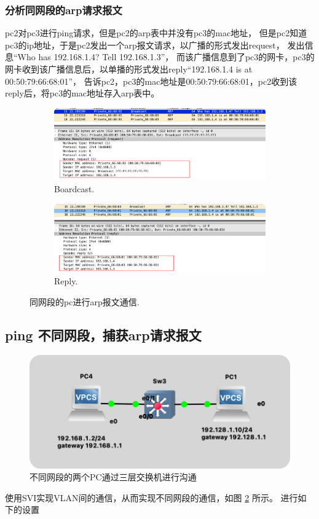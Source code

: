 \documentclass[a4paper,12pt]{report}
\begin{document}
\begin{spacing}{1.5}
\subsubsection*{分析同网段的arp请求报文}
pc2对pc3进行ping请求，但是pc2的arp表中并没有pc3的mac地址，
但是pc2知道pc3的ip地址，于是pc2发出一个arp报文请求，以广播的形式发出request，
发出信息“Who has 192.168.1.4? Tell 192.168.1.3”，
而该广播信息到了pc3的网卡，pc3的网卡收到该广播信息后，以单播的形式发出reply“192.168.1.4 is at 00:50:79:66:68:01”，
告诉pc2，pc3的mac地址是00:50:79:66:68:01，pc2收到该reply后，将pc3的mac地址存入arp表中。
\begin{figure}[h!]
  \centering
  \begin{subfigure}[b]{0.4\linewidth}
    \includegraphics[width=\linewidth]{figure/boardcast.png}
    \caption{Boardcast.}
  \end{subfigure}
  \begin{subfigure}[b]{0.4\linewidth}
    \includegraphics[width=\linewidth]{figure/reply.png}
    \caption{Reply.}
  \end{subfigure}
  \caption{同网段的pc进行arp报文通信.}
  \label{fig:sameip}
\end{figure}

\subsection{ping 不同网段，捕获arp请求报文}
\begin{figure}[h!]
  \centering
\includegraphics[width=12cm]{figure/vlan.png}
\caption{不同网段的两个PC通过三层交换机进行沟通}
\label{pic11}
\end{figure}
使用SVI实现VLAN间的通信，从而实现不同网段的通信，如图 \ref{pic11} 所示。
进行如下的设置


\end{spacing}
\end{document}
